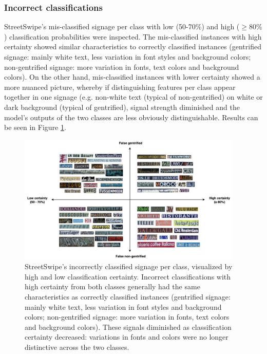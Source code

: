 \subsubsection{Incorrect classifications} 

StreetSwipe's mis-classified signage per class with low (50-70\%) and high ($ \geq 80\% $) classification probabilities were inspected. The mis-classified instances with high certainty showed similar characteristics to correctly classified instances (gentrified signage: mainly white text, less variation in font styles and background colors; non-gentrified signage: more variation in fonts, text colors and background colors). On the other hand, mis-classified instances with lower certainty showed a more nuanced picture, whereby if distinguishing features per class appear together in one signage (e.g. non-white text (typical of non-gentrified) on white or dark background (typical of gentrified), signal strength diminished and the model's outputs of the two classes are less obviously distinguishable. Results can be seen in Figure \ref{fig:output_vis_SS_incorrect}.

\begin{figure}[]
    \centering
    \includegraphics[width=0.95\textwidth]{media/results/output_vis-SS_incorrect.jpg}
    \caption{StreetSwipe's incorrectly classified signage per class, visualized by high and low classification certainty. Incorrect classifications with high certainty from both classes generally had the same characteristics as correctly classified instances (gentrified signage: mainly white text, less variation in font styles and background colors; non-gentrified signage: more variation in fonts, text colors and background colors). These signals diminished as classification certainty decreased: variations in fonts and colors were no longer distinctive across the two classes.}
    \label{fig:output_vis_SS_incorrect}
\end{figure}


